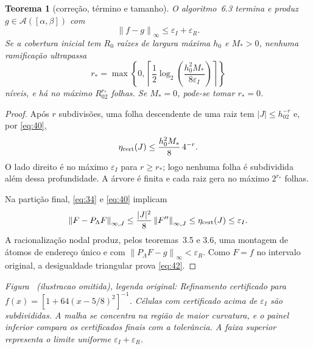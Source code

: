 \documentclass[11pt,a4paper]{article}
\theoremstyle{preciso}
\newtheorem{teorema}{Teorema}[section]
\theoremstyle{definition}
\newcommand{\Asm}{\mathcal A}
\newcommand{\norm}[1]{\left\|#1\right\|_{\infty}}
\newcommand{\normK}[2]{\left\|#1\right\|_{\infty,#2}}
\newcommand{\eqn}[2]{\begin{equation}\label{eq:#1}#2\end{equation}}
\newcommand{\figura}[4]{\par\refstepcounter{figure}\label{fig:#4}\noindent\textit{Figura \thefigure~(ilustracao omitida), legenda original: #3}\par}
\begin{document}
\begin{teorema}[correção, término e tamanho]
O algoritmo~6.3 termina e produz $g\in\Asm([\alpha,\beta])$ com
\eqn{42}{\norm{f-g}\le\varepsilon_I+\varepsilon_R.}
Se a cobertura inicial tem $R_0$ raízes de largura máxima $h_0$ e $M_*>0$, nenhuma ramificação ultrapassa
\eqn{43}{r_*=\max\left\{0,\left\lceil\frac12\log_2\left(\frac{h_0^2M_*}{8\varepsilon_I}\right)\right\rceil\right\}}
níveis, e há no máximo $R_02^{r_*}$ folhas. Se $M_*=0$, pode-se tomar $r_*=0$.
\end{teorema}
\begin{proof}
Após $r$ subdivisões, uma folha descendente de uma raiz tem $|J|\le h_02^{-r}$ e, por \eqref{eq:40},
\[
\eta_{\rm cert}(J)\le\frac{h_0^2M_*}8\,4^{-r}.
\]
O lado direito é no máximo $\varepsilon_I$ para $r\ge r_*$; logo nenhuma folha é subdividida além dessa profundidade. A árvore é finita e cada raiz gera no máximo $2^{r_*}$ folhas.

Na partição final, \eqref{eq:34} e \eqref{eq:40} implicam
\[
\normK{F-P_\Lambda F}{J}\le\frac{|J|^2}8\normK{F''}{J}\le\eta_{\rm cert}(J)\le\varepsilon_I.
\]
A racionalização nodal produz, pelos teoremas~3.5 e 3.6, uma montagem de átomos de endereço único e com $\norm{P_\Lambda F-g}<\varepsilon_R$. Como $F=f$ no intervalo original, a desigualdade triangular prova \eqref{eq:42}.
\end{proof}
\figura{06_refinamento_certificado}{.90}{Refinamento certificado para $f(x)=[1+64(x-5/8)^2]^{-1}$. Células com certificado acima de $\varepsilon_I$ são subdivididas. A malha se concentra na região de maior curvatura, e o painel inferior compara os certificados finais com a tolerância. A faixa superior representa o limite uniforme $\varepsilon_I+\varepsilon_R$.}{refinamento}
\end{document}
